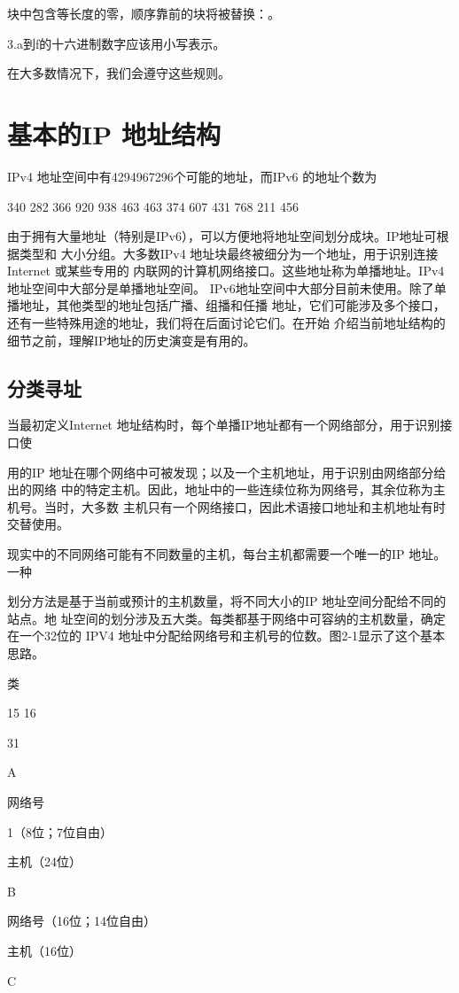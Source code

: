 块中包含等长度的零，顺序靠前的块将被替换：。

3.a到f的十六进制数字应该用小写表示。

在大多数情况下，我们会遵守这些规则。

\section{基本的IP 地址结构}
IPv4 地址空间中有4294967296个可能的地址，而IPv6 的地址个数为

340 282 366 920 938 463 463 374 607 431 768 211 456

由于拥有大量地址（特别是IPv6），可以方便地将地址空间划分成块。IP地址可根据类型和
大小分组。大多数IPv4 地址块最终被细分为一个地址，用于识别连接 Internet 或某些专用的
内联网的计算机网络接口。这些地址称为单播地址。IPv4地址空间中大部分是单播地址空间。
IPv6地址空间中大部分目前未使用。除了单播地址，其他类型的地址包括广播、组播和任播
地址，它们可能涉及多个接口，还有一些特殊用途的地址，我们将在后面讨论它们。在开始
介绍当前地址结构的细节之前，理解IP地址的历史演变是有用的。

\subsection{分类寻址}
当最初定义Internet 地址结构时，每个单播IP地址都有一个网络部分，用于识别接口使

用的IP 地址在哪个网络中可被发现；以及一个主机地址，用于识别由网络部分给出的网络
中的特定主机。因此，地址中的一些连续位称为网络号，其余位称为主机号。当时，大多数
主机只有一个网络接口，因此术语接口地址和主机地址有时交替使用。

现实中的不同网络可能有不同数量的主机，每台主机都需要一个唯一的IP 地址。一种

划分方法是基于当前或预计的主机数量，将不同大小的IP 地址空间分配给不同的站点。地
址空间的划分涉及五大类。每类都基于网络中可容纳的主机数量，确定在一个32位的 IPV4
地址中分配给网络号和主机号的位数。图2-1显示了这个基本思路。

类

15 16

31

A

网络号

1（8位；7位自由）

主机（24位）

B

网络号（16位；14位自由）

主机（16位）

C


